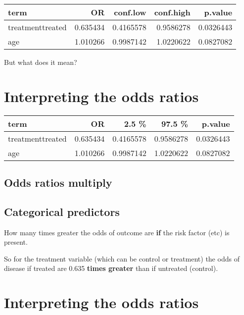 \documentclass[]{tufte-handout}
\begin{document}
\begin{tabular}{l|r|r|r|r}
\hline
term & OR & conf.low & conf.high & p.value\\
\hline
treatmenttreated & 0.635434 & 0.4165578 & 0.9586278 & 0.0326443\\
\hline
age & 1.010266 & 0.9987142 & 1.0220622 & 0.0827082\\
\hline
\end{tabular}

But what does it mean?

\hypertarget{interpreting-the-odds-ratios}{%
\section{Interpreting the odds
ratios}\label{interpreting-the-odds-ratios}}

\begin{tabular}{l|r|r|r|r}
\hline
term & OR & 2.5 \% & 97.5 \% & p.value\\
\hline
treatmenttreated & 0.635434 & 0.4165578 & 0.9586278 & 0.0326443\\
\hline
age & 1.010266 & 0.9987142 & 1.0220622 & 0.0827082\\
\hline
\end{tabular}

\hypertarget{odds-ratios-multiply}{%
\subsection{\texorpdfstring{Odds ratios
\textbf{multiply}}{Odds ratios multiply}}\label{odds-ratios-multiply}}

\hypertarget{categorical-predictors}{%
\subsection{Categorical predictors}\label{categorical-predictors}}

How many times greater the odds of outcome are \textbf{if} the risk
factor (etc) is present.

So for the treatment variable (which can be control or treatment) the
odds of disease if treated are 0.635 \textbf{times greater} than if
untreated (control).

\hypertarget{interpreting-the-odds-ratios-1}{%
\section{Interpreting the odds
ratios}\label{interpreting-the-odds-ratios-1}}
\end{document}
